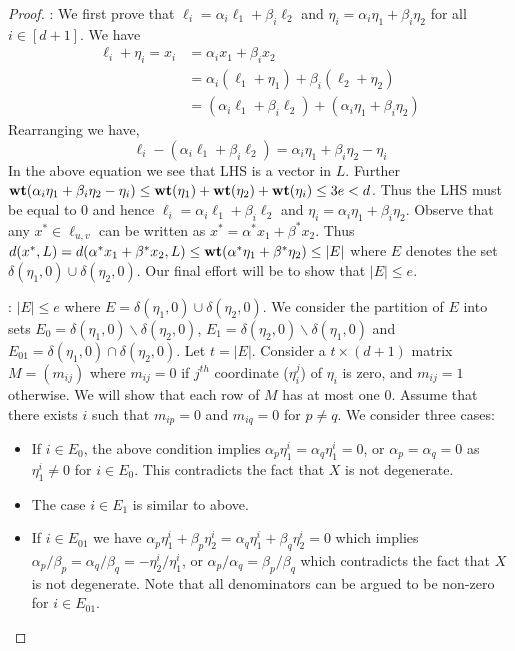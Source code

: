 \begin{proof}
: We first prove
that $\ell_i=\alpha_i\ell_1+\beta_i\ell_2$ and
$\eta_i=\alpha_i\eta_1+\beta_i\eta_2$ for
all $i\in [d+1]$. We have
\begin{align*}
\ell_i+\eta_i = x_i &= \alpha_ix_1 + \beta_ix_2 \\
    &= \alpha_i(\ell_1+\eta_1) + \beta_i(\ell_2 + \eta_2) \\
    &= (\alpha_i\ell_1 + \beta_i\ell_2) + (\alpha_i\eta_1 + \beta_i\eta_2)
\end{align*}
Rearranging we have,
\begin{equation*}
\ell_i - (\alpha_i\ell_1 + \beta_i\ell_2) = \alpha_i\eta_1 +
\beta_i\eta_2 - \eta_i
\end{equation*}
In the above equation we see that LHS is a vector in $L$. Further
$\mathbf{wt}({\alpha_i\eta_1 + \beta_i\eta_2 - \eta_i})\leq
\mathbf{wt}({\eta_1})+\mathbf{wt}({\eta_2})+\mathbf{wt}({\eta_i})\leq 3e < d$. Thus the LHS must be equal to
$0$ and hence $\ell_i = \alpha_i\ell_1 + \beta_i\ell_2$ and
$\eta_i=\alpha_i\eta_1+\beta_i\eta_2$. Observe that any $x^\ast\in \ell_{u,v}$ can
be written as $x^\ast=\alpha^\ast x_1+\beta^\ast x_2$. Thus
$d(x^\ast,L)=d(\alpha^\ast x_1+\beta^\ast x_2,L)\leq \mathbf{wt}({\alpha^\ast
\eta_1+\beta^\ast \eta_2})\leq |E|$ where $E$ denotes the set
$\delta(\eta_1,0)\cup \delta(\eta_2,0)$. Our final effort will be to show that
$|E|\leq e$.

: $|E|\leq e$ where $E = \delta(\eta_1,0)\cup
\delta(\eta_2,0)$. We consider the partition of $E$ into sets
$E_0=\delta(\eta_1,0)\backslash \delta(\eta_2,0)$,
$E_1=\delta(\eta_2,0)\backslash \delta(\eta_1,0)$ and
$E_{01}=\delta(\eta_1,0)\cap \delta(\eta_2,0)$. Let $t=|E|$. Consider a $t\times (d+1)$ matrix $M=(m_{ij})$
where $m_{ij}=0$ if $j^{th}$ coordinate ($\eta_i^j$) of $\eta_i$ is zero, and $m_{ij}=1$
otherwise. We will show that each row of $M$ has at most one $0$. Assume that
there exists $i$ such that $m_{ip}=0$ and $m_{iq}=0$ for $p\neq q$. We consider
three cases:
\begin{itemize}
\item If $i\in E_0$, the above condition implies $\alpha_p\eta_1^i =
\alpha_q\eta_1^i=0$, or $\alpha_p=\alpha_q=0$ as $\eta_1^i\neq 0$ for $i\in E_0$.
This contradicts the fact that $X$ is not degenerate.
\item The case $i\in E_1$ is similar to above.
\item If $i\in E_{01}$ we have
$\alpha_p\eta_1^i+\beta_p\eta_2^i=\alpha_q\eta_1^i+\beta_q\eta_2^i=0$ which
implies $\alpha_p/\beta_p=\alpha_q/\beta_q=-\eta_2^i/\eta_1^i$, or
$\alpha_p/\alpha_q = \beta_p/\beta_q$ which contradicts the fact that $X$ is
not degenerate. Note that all denominators can be argued to be non-zero for $i\in E_{01}$. 
\end{itemize}


\end{proof}
